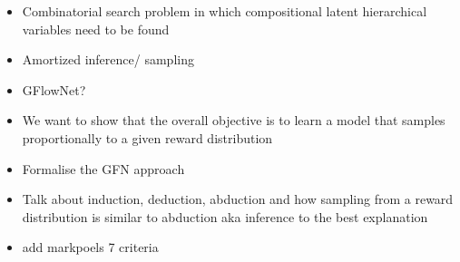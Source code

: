 
\begin{itemize}
    \item Combinatorial search problem in which compositional latent hierarchical variables need to be found
    \item Amortized inference/ sampling
    \item GFlowNet?
    \item We want to show that the overall objective is to learn a model that samples proportionally to a given reward distribution
    \item Formalise the GFN approach
    \item Talk about induction, deduction, abduction and how sampling from a reward distribution is similar to abduction aka inference to the best explanation
    \item add markpoels 7 criteria 
\end{itemize}
